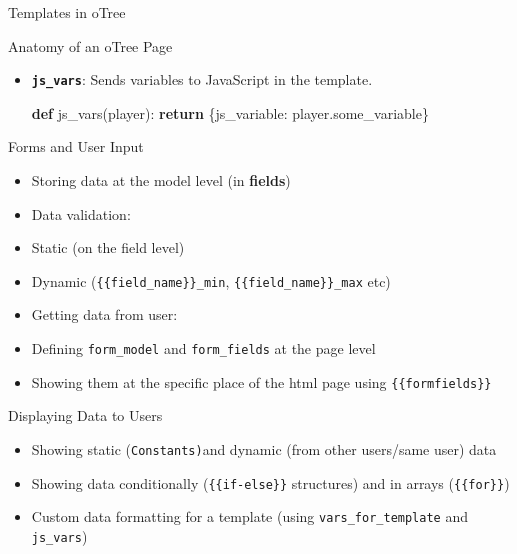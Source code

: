 \documentclass[
  ignorenonframetext,
]{beamer}
\newenvironment{Shaded}{\begin{snugshade}}{\end{snugshade}}
\newcommand{\ControlFlowTok}[1]{\textcolor[rgb]{0.13,0.29,0.53}{\textbf{#1}}}
\newcommand{\KeywordTok}[1]{\textcolor[rgb]{0.13,0.29,0.53}{\textbf{#1}}}
\newcommand{\NormalTok}[1]{#1}
\newcommand{\StringTok}[1]{\textcolor[rgb]{0.31,0.60,0.02}{#1}}
\providecommand{\tightlist}{%
  \setlength{\itemsep}{0pt}\setlength{\parskip}{0pt}}
\begin{document}
\begin{frame}[fragile]{Templates in oTree}
\begin{block}{Anatomy of an oTree Page}
\begin{itemize}
\begin{Shaded}
\begin{Highlighting}[]
\KeywordTok{def}\NormalTok{ before\_next\_page(player):}
\NormalTok{    player.calculate\_something()}
\end{Highlighting}
\end{Shaded}
\item
  \textbf{\texttt{js\_vars}}: Sends variables to JavaScript in the
  template.

\begin{Shaded}
\begin{Highlighting}[]
\KeywordTok{def}\NormalTok{ js\_vars(player):}
    \ControlFlowTok{return}\NormalTok{ \{}\StringTok{\textquotesingle{}js\_variable\textquotesingle{}}\NormalTok{: player.some\_variable\}}
\end{Highlighting}
\end{Shaded}
\end{itemize}
\end{block}
\end{frame}

\begin{frame}[fragile]{Forms and User Input}
\label{forms-and-user-input}
\begin{itemize}
\tightlist
\item
  Storing data at the model level (in \textbf{fields})
\item
  Data validation:
\item
  Static (on the field level)
\item
  Dynamic (\texttt{\{\{field\_name\}\}\_min},
  \texttt{\{\{field\_name\}\}\_max} etc)
\item
  Getting data from user:
\item
  Defining \texttt{form\_model} and \texttt{form\_fields} at the page
  level
\item
  Showing them at the specific place of the html page using
  \texttt{\{\{formfields\}\}}
\end{itemize}
\end{frame}

\begin{frame}[fragile]{Displaying Data to Users}
\label{displaying-data-to-users}
\begin{itemize}
\tightlist
\item
  Showing static (\texttt{Constants)}and dynamic (from other users/same
  user) data
\item
  Showing data conditionally (\texttt{\{\{if-else\}\}} structures) and
  in arrays (\texttt{\{\{for\}\}})
\item
  Custom data formatting for a template (using
  \texttt{vars\_for\_template} and \texttt{js\_vars})
\end{itemize}
\end{frame}
\end{document}
